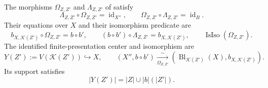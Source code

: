 \begin{theorem}
  \label{thm:nagata-composition-of-blowups}

  The morphisms $\Omega_{Z,Z'}$ and $\Lambda_{Z,Z'}$ of
   satisfy
  \[
    \Lambda_{Z,Z'}\circ\Omega_{Z,Z'}=\operatorname{id}_{X''},
    \qquad
    \Omega_{Z,Z'}\circ\Lambda_{Z,Z'}=\operatorname{id}_{B}.
  \]
  Their equations over $X$ and their isomorphism predicate are
  \[
    b_{X,\mathcal K(Z')}\circ\Omega_{Z,Z'}=b\circ b',
    \qquad
    (b\circ b')\circ\Lambda_{Z,Z'}=b_{X,\mathcal K(Z')},
    \qquad
    \operatorname{IsIso}(\Omega_{Z,Z'}).
  \]
  The identified finite-presentation center and isomorphism are
  \[
    Y(Z'):=V(\mathcal K(Z'))\hookrightarrow X,
    \qquad
    (X'',b\circ b')\xrightarrow[\Omega_{Z,Z'}]{\sim}
      (\operatorname{Bl}_{\mathcal K(Z')}(X),b_{X,\mathcal K(Z')}).
  \]
  Its support satisfies
  \[
    |Y(Z')|=|Z|\cup |b|(|Z'|).
  \]
\end{theorem}


